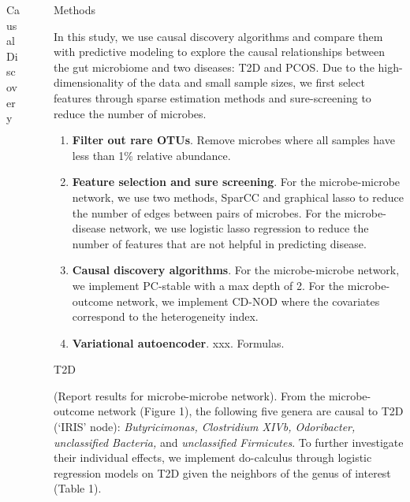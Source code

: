 \documentclass[final]{beamer}
\newlength{\sepwidth}
\newlength{\colwidth}
\newcommand{\separatorcolumn}{\begin{column}{\sepwidth}\end{column}}
\begin{document}
\begin{frame}[t]
\begin{columns}[t]
\begin{column}{\colwidth}
\begin{alertblock}{Causal Discovery}
	  \end{alertblock}

\end{column}

\separatorcolumn

\begin{column}{\colwidth}

  \begin{block}{Methods}

   In this study, we use causal discovery algorithms and compare them with 
   predictive modeling to explore the causal relationships between the 
   gut microbiome and two diseases: T2D and PCOS. Due to the high-dimensionality
   of the data and small sample sizes, we first select features through sparse
   estimation methods and sure-screening to reduce the number of microbes. 

    \begin{enumerate}
      \item \textbf{Filter out rare OTUs}. Remove microbes where all samples have less than 1\%
      relative abundance. 
      \item \textbf{Feature selection and sure screening}. For the microbe-microbe network, we use two 
      methods, SparCC \cite{friedman2012sparcc} and graphical lasso to reduce the number of edges between pairs of microbes.
      For the microbe-disease network, we use logistic lasso regression to reduce the number of 
      features that are not helpful in predicting disease. 
      \item \textbf{Causal discovery algorithms}. For the microbe-microbe network, we implement
      PC-stable with a max depth of 2. For the microbe-outcome network, we implement CD-NOD
      where the covariates correspond to the heterogeneity index. 
      \item \textbf{Variational autoencoder}. xxx. Formulas.
    \end{enumerate}

  \end{block}

  \begin{block}{T2D}

    (Report results for microbe-microbe network). From the microbe-outcome network (Figure 1), the following five genera are causal to T2D (`IRIS' node): \textit{Butyricimonas, Clostridium XIVb, Odoribacter, unclassified Bacteria,} and \textit{unclassified Firmicutes}. To further investigate their individual effects, we implement do-calculus through logistic regression models on T2D given the neighbors of the genus of interest (Table 1). 


\end{block}
\end{column}
\end{columns}
\end{frame}
\end{document}
